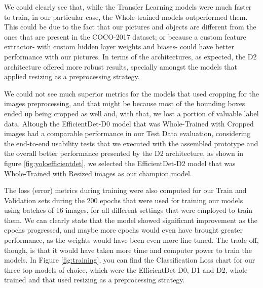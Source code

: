 
We could clearly see that, while the Transfer Learning models were much faster to train,
in our particular case, the Whole-trained models outperformed them. This could be 
due to the fact that our pictures and objects are different from the
ones that are present in the COCO-2017 dataset; or because a custom feature extractor- 
with custom hidden layer weights and biases- could have better performance with our pictures. 
In terms of the architectures, as expected, the D2 architecture offered more robust results, specially
amongst the models that applied resizing as a preprocessing strategy. 

We could not see much superior metrics for the models that used cropping for the images preprocessing, 
and that might be because most of the bounding boxes ended up being cropped as well and, with that, we lost
a portion of valuable label data. Altough the EfficientDet-D0 model that was Whole-Trained with Cropped images
had a comparable performance in our Test Data evaluation, considering the end-to-end usability tests that we executed 
with the assembled prototype and the overall better performance presented by the D2 architecture, as shown in
figure \ref{fig:yoloefficientdet}, we selected the EfficientDet-D2 model that was Whole-Trained with Resized
images as our champion model.

The loss (error) metrics during training were also computed for our Train and Validation sets during the 
200 epochs that were used for training our models using batches of 16 images, for all different 
settings that were employed to train them. We can clearly state that the model showed significant
improvement as the epochs progressed, and maybe more epochs would even have brought greater performance,
as the weights would have been even more fine-tuned. The trade-off, though, is that it would have 
taken more time and computer power to train the models.
In Figure \ref{fig:training}, you can find the Classification Loss chart for our three top models of choice, which were
the EfficientDet-D0, D1 and D2, whole-trained and that used resizing as a preprocessing strategy.

